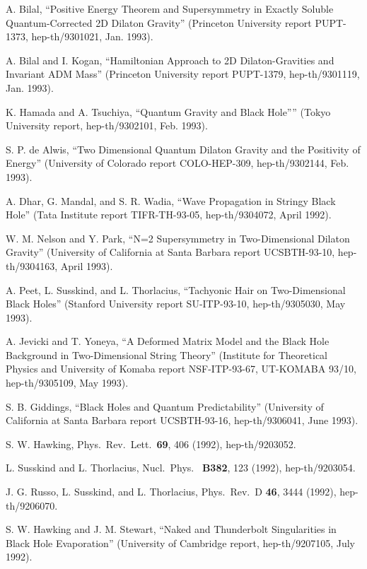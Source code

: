 \begin{thebibliography}{999}
 A. Bilal, ``Positive Energy Theorem and Supersymmetry
in
Exactly Soluble Quantum-Corrected 2D Dilaton Gravity''
(Princeton University report PUPT-1373, hep-th/9301021, Jan. 1993).

 A. Bilal and I. Kogan, ``Hamiltonian Approach to 2D
Dilaton-Gravities
and Invariant ADM Mass'' (Princeton University report PUPT-1379,
hep-th/9301119, Jan. 1993).

 K. Hamada and A. Tsuchiya, ``Quantum Gravity and Black
Hole''''
(Tokyo University report, hep-th/9302101, Feb. 1993).

 S. P. de Alwis, ``Two Dimensional Quantum Dilaton
Gravity and
the Positivity of Energy'' (University of Colorado report
COLO-HEP-309,
hep-th/9302144, Feb. 1993).

 A. Dhar, G. Mandal, and S. R. Wadia, ``Wave
Propagation in
Stringy
Black Hole'' (Tata Institute report TIFR-TH-93-05, hep-th/9304072,
April 1992).

 W. M. Nelson and Y. Park, ``N=2 Supersymmetry in
Two-Dimensional
Dilaton Gravity'' (University of California at Santa Barbara report
UCSBTH-93-10,
hep-th/9304163, April 1993).

 A. Peet, L. Susskind, and L. Thorlacius, ``Tachyonic
Hair on
Two-Dimensional Black Holes'' (Stanford University report
SU-ITP-93-10,
hep-th/9305030, May 1993).

 A. Jevicki and T. Yoneya, ``A Deformed Matrix Model
and
the Black Hole Background in Two-Dimensional String Theory''
(Institute for Theoretical Physics and University of Komaba report
NSF-ITP-93-67, UT-KOMABA 93/10, hep-th/9305109, May 1993).

 S. B. Giddings, ``Black Holes and Quantum
Predictability''
(University of California at Santa Barbara report UCSBTH-93-16,
hep-th/9306041, June 1993).

 S. W. Hawking, Phys.\ Rev.\ Lett.\ {\bf 69}, 406
(1992),
hep-th/9203052.

 L. Susskind and L. Thorlacius, Nucl.\ Phys.\ {\bf
B382}, 123
(1992), hep-th/9203054.

 J. G. Russo, L. Susskind, and L. Thorlacius, Phys.\
Rev.\ D{\bf
46}, 3444 (1992), hep-th/9206070.

 S. W. Hawking and J. M. Stewart, ``Naked and
Thunderbolt
Singularities in Black Hole Evaporation'' (University of Cambridge
report,
hep-th/9207105, July 1992).


\end{thebibliography}
